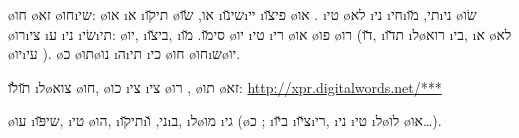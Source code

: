 \o{חו} \o{זא} \o{חו}\i{שי}:  \o{או}  \i{א} \i{תי}\u{קו} \o{או}, \u{שׂו}  \i{שי}\u{נו}\i{יי} \i{פי}\u{צו} \o{או} .  \i{טי} \o{לא} \i{ני} \i{חי}\i{תי},   \u{מו}\i{ני} \o{שׂו}   \o{רו}\i{צי} \i{ע}  \i{ני} \i{שׂי}\i{תי}: \o{יו}, \i{בי}\u{צו}, \i{סי}\u{מו}.  \u{מו}    \o{יו} \i{טי} \i{רי} \o{או} \o{פו} \o{רו} (\u{דו}, \i{ת}\u{דו} \i{ל}\o{רוא} \i{בי}, \i{א}  \o{לא} \o{יו}\i{עי} ).  \o{כ} \o{תו}\o{נו} \i{ה}\i{תי}   \i{כי}  \o{חו}  \o{חו}\i{ש}\o{יו}.

\u{תו}\u{לו} \i{ל}\o{צוא}  \o{חו}, \o{כו} \i{צי}  \i{צי} \o{רו} , \o{תו} \o{זא}: \url{http://xpr.digitalwords.net/***}

  \o{עו} \i{שי}\u{פּו}, \i{טי} \o{הו}, \i{תי}\u{קו}\i{ני}, \u{ו}\i{ב},  \i{ל}\o{מו}     \i{גי} (\o{כ} ; \i{ב}\u{יו}   \i{צ}\u{יו}\i{רי}, \i{ני} \i{טי}{\gnuvah} \i{ל}\o{לו} \o{או}…).

